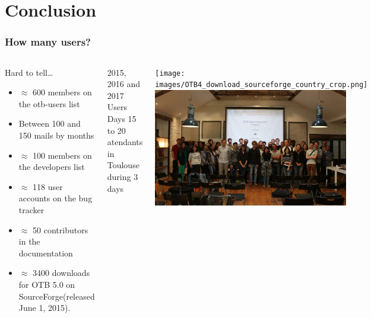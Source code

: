 \documentclass[8pt]{beamer}
\begin{document}
\section{Conclusion}
\begin{frame}
\frametitle{How many users?}
\begin{columns}[c]
\begin{block}{Hard to tell\ldots}
\begin{itemize}
    \item $\approx$ 600 members on the otb-users list
    \item Between 100 and 150 mails by months
    \item $\approx$ 100 members on the developers list
    \item $\approx$ 118 user accounts on the bug tracker
    \item $\approx$ 50 contributors in the documentation
    \item $\approx$ 3400 downloads for OTB 5.0 on SourceForge(released June 1, 2015).
  \end{itemize}
\end{block}
\begin{block}{2015, 2016 and 2017 Users Days}
  15 to 20 atendants in Toulouse during 3 days
\end{block}
\texttt{[image: images/OTB4\_download\_sourceforge\_country\_crop.png]}\\
\includegraphics[width=0.9\textwidth]{images/userdays2017.jpg}
\end{columns}
\end{frame}
\end{document}

